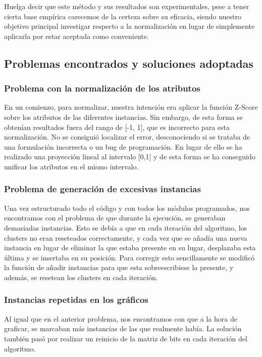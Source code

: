 \documentclass[10pt,a4paper]{article}
\begin{document}
Huelga decir que este método y sus resultados son experimentales, pese a tener cierta base empírica carecemos de la certeza sobre su eficacia, siendo nuestro objetivo 
principal investigar respecto a la normalización en lugar de simplemente aplicarla por estar aceptada como conveniente. 


\subsection{Problemas encontrados y soluciones adoptadas}


\subsubsection{Problema con la normalización de los atributos}
En un comienzo, para normalizar, nuestra intención era aplicar la función Z-Score sobre los atributos de las diferentes instancias. Sin embargo, de esta forma se 
obtenían resultados fuera del rango de [-1, 1], que es incorrecto para esta normalización. No se consiguió localizar el error, desconociendo si se trataba de una
 formulación incorrecta o un bug de programación. En lugar de ello se ha realizado una proyección lineal al intervalo [0,1] y de esta forma se ha conseguido 
 unificar los atributos en el mismo intervalo.

\subsubsection{Problema de generación de excesivas instancias}
Una vez estructurado todo el código y con todos los módulos programados, nos encontramos con el problema de que durante la ejecución, 
se generaban demasiadas instancias. Esto se debía a que en cada iteración del algoritmo, los clusters no eran reseteados correctamente, y cada vez que se añadía 
una nueva instancia en lugar de eliminar la que estaba presente en su lugar, desplazaba esta última y se insertaba en su posición. Para corregir esto sencillamente
se modificó la función de añadir instancias para que esta sobreescribiese la presente, y además, se resetean los clusters en cada iteración.

\subsubsection{Instancias repetidas en los gráficos}
Al igual que en el anterior problema, nos encontramos con que a la hora de graficar, se marcaban más instancias de las que realmente había. La solución también pasó por 
realizar un reinicio de la matriz de bits en cada iteración del algoritmo.
\end{document}
